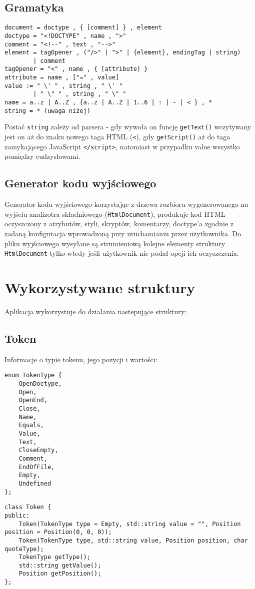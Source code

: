 \documentclass[11pt]{article}
\def\code#1{\texttt{#1}}
\begin{document}
\subsection{Gramatyka}

\begin{verbatim}
document = doctype , { [comment] } , element
doctype = "<!DOCTYPE" , name , ">"
comment = "<!--" , text , "-->"
element = tagOpener , ("/>" | ">" | {element}, endingTag | string)
		| comment
tagOpener = "<" , name , { [attribute] }
attribute = name , ["=" , value]
value := " \' " , string , " \' "
        | " \" " , string , " \" "
name = a..z | A..Z , {a..z | A..Z | 1..6 | : | - | < } , *
string = * (uwaga niżej)
\end{verbatim}

Postać \code{string} zależy od parsera - gdy wywoła on funcję \code{getText()} wczytywany jest on aż do znaku nowego taga HTML (\code{<}), gdy \code{getScript()} aż do taga zamykającego JavaScript \code{</script>}, natomiast w przypadku value wszystko pomiędzy cudzysłowami.

\subsection{Generator kodu wyjściowego}
Generator kodu wyjściowego korzystając z drzewa rozbioru wygenerowanego na wyjściu analizotra składniowego (\code{HtmlDocument}), produkuje kod HTML oczyszczony z atrybutów, styli, skryptów, komentarzy, doctype'a zgodnie z zadaną konfiguracja wprowadzoną przy uruchamianiu przez użytkownika.
Do pliku wyjściowego wysyłane są strumieniową kolejne elementy struktury \code{HtmlDocument} tylko wtedy jeśli użytkownik nie podał opcji ich oczyszczenia.

\section{Wykorzystywane struktury}
Aplikacja wykorzystuje do działania nastepujące struktury:
\subsection{Token}
Informacje o typie tokenu, jego pozycji i wartości:
\begin{lstlisting}
enum TokenType {
    OpenDoctype,
    Open,
    OpenEnd,
    Close,
    Name,
    Equals,
    Value,
    Text,
    CloseEmpty,
    Comment,
    EndOfFile,
    Empty,
    Undefined
};
\end{lstlisting}
\begin{lstlisting}
class Token {
public:
    Token(TokenType type = Empty, std::string value = "", Position position = Position(0, 0, 0));
    Token(TokenType type, std::string value, Position position, char quoteType);
    TokenType getType();
    std::string getValue();
    Position getPosition();
};
\end{lstlisting}
\end{document}
